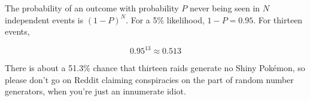 \begin{tcolorbox}[enhanced,title=An aside regarding independent events,halign title=flush center]
The probability of an outcome with probability $P$ never being seen in $N$ independent
  events is ${(1 - P)}^N$. For a 5\% likelihood, $1 - P = 0.95$. For thirteen events,

  \[ 0.95^{13} ≈ 0.513 \]

There is about a 51.3\% chance that thirteen raids generate no Shiny Pokémon,
  so please don't go on Reddit claiming conspiracies on the part of
  random number generators, when you're just an innumerate idiot.
\end{tcolorbox}
